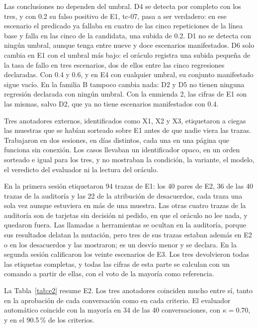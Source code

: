 Las conclusiones no dependen del umbral. D4 se detecta por completo con los tres, y con 0.2 su falso positivo de E1, tc-07, pasa a ser verdadero: en ese escenario el predicado ya fallaba en cuatro de las cinco repeticiones de la línea base y falla en las cinco de la candidata, una subida de 0.2. D1 no se detecta con ningún umbral, aunque tenga entre nueve y doce escenarios manifestados. D6 solo cambia en E1 con el umbral más bajo: el oráculo registra una subida pequeña de la tasa de fallo en tres escenarios, dos de ellos entre las cinco regresiones declaradas. Con 0.4 y 0.6, y en E4 con cualquier umbral, su conjunto manifestado sigue vacío. En la familia B tampoco cambia nada: D2 y D5 no tienen ninguna regresión declarada con ningún umbral. Con la enmienda 2, las cifras de E1 son las mismas, salvo D2, que ya no tiene escenarios manifestados con 0.4.
\par

Tres anotadores externos, identificados como X1, X2 y X3, etiquetaron a ciegas las muestras que se habían sorteado sobre E1 antes de que nadie viera las trazas. Trabajaron en dos sesiones, en días distintos, cada una en una página que funciona sin conexión. Los casos llevaban un identificador opaco, en un orden sorteado e igual para los tres, y no mostraban la condición, la variante, el modelo, el veredicto del evaluador ni la lectura del oráculo.
\par
En la primera sesión etiquetaron 94 trazas de E1: los 40 pares de E2, 36 de las 40 trazas de la auditoría y las 22 de la atribución de desacuerdos, cada traza una sola vez aunque estuviera en más de una muestra. Las otras cuatro trazas de la auditoría son de tarjetas sin decisión ni pedido, en que el oráculo no lee nada, y quedaron fuera. Las llamadas a herramientas se ocultan en la auditoría, porque sus resultados delatan la mutación, pero tres de sus trazas estaban además en E2 o en los desacuerdos y las mostraron; es un desvío menor y se declara. En la segunda sesión calificaron los veinte escenarios de E3. Los tres devolvieron todas las etiquetas completas, y todas las cifras de esta parte se calculan con un comando a partir de ellas, con el voto de la mayoría como referencia.
\par

La Tabla~\ref{tab:e2} resume E2. Los tres anotadores coinciden mucho entre sí, tanto en la aprobación de cada conversación como en cada criterio. El evaluador automático coincide con la mayoría en 34 de las 40 conversaciones, con $\kappa = 0.70$, y en el 90.5\,\% de los criterios.
\par

